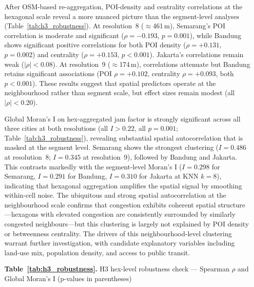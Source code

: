 \documentclass[12pt,a4paper]{article}
\begin{document}
After OSM-based re-aggregation, POI-density and centrality correlations at the hexagonal scale reveal a more nuanced picture than the segment-level analyses (Table~\ref{tab:h3_robustness}). At resolution~8 ($\approx$461\,m), Semarang's POI correlation is moderate and significant ($\rho = -0.193$, $p = 0.001$), while Bandung shows significant positive correlations for both POI density ($\rho = +0.131$, $p = 0.002$) and centrality ($\rho = +0.153$, $p < 0.001$). Jakarta's correlations remain weak ($|\rho| < 0.08$). At resolution~9 ($\approx$174\,m), correlations attenuate but Bandung retains significant associations (POI $\rho = +0.102$, centrality $\rho = +0.093$, both $p < 0.001$). These results suggest that spatial predictors operate at the neighbourhood rather than segment scale, but effect sizes remain modest (all $|\rho| < 0.20$).

Global Moran's I on hex-aggregated jam factor is strongly significant across all three cities at both resolutions (all $I > 0.22$, all $p = 0.001$; Table~\ref{tab:h3_robustness}), revealing substantial spatial autocorrelation that is masked at the segment level. Semarang shows the strongest clustering ($I = 0.486$ at resolution~8; $I = 0.345$ at resolution~9), followed by Bandung and Jakarta. This contrasts markedly with the segment-level Moran's I ($I = 0.298$ for Semarang, $I = 0.291$ for Bandung, $I = 0.310$ for Jakarta at KNN $k{=}8$), indicating that hexagonal aggregation amplifies the spatial signal by smoothing within-cell noise. The ubiquitous and strong spatial autocorrelation at the neighbourhood scale confirms that congestion exhibits coherent spatial structure---hexagons with elevated congestion are consistently surrounded by similarly congested neighbours---but this clustering is largely not explained by POI density or betweenness centrality. The drivers of this neighbourhood-level clustering warrant further investigation, with candidate explanatory variables including land-use mix, population density, and access to public transit.

\textbf{Table~\ref{tab:h3_robustness}.} H3 hex-level robustness check --- Spearman $\rho$ and Global Moran's I (p-values in parentheses)
\end{document}
